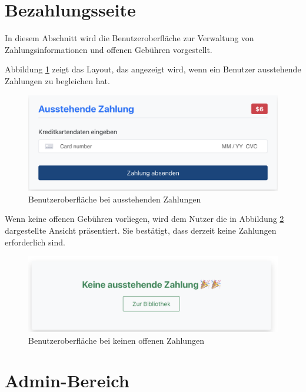 \section{Bezahlungsseite}

In diesem Abschnitt wird die Benutzeroberfläche zur Verwaltung von Zahlungsinformationen und offenen Gebühren vorgestellt.

\noindent Abbildung \ref{fig:Outstanding-payment} zeigt das Layout, das angezeigt wird, wenn ein Benutzer ausstehende Zahlungen zu begleichen hat. 

\begin{figure}[H]
	\centering
	\includegraphics[width=1.0\textwidth]{images/UI-screenshots/Outstanding-payment.png}
	\caption{Benutzeroberfläche bei ausstehenden Zahlungen}
	\label{fig:Outstanding-payment}
\end{figure}

\noindent Wenn keine offenen Gebühren vorliegen, wird dem Nutzer die in Abbildung \ref{fig:No-Payment} dargestellte Ansicht präsentiert. Sie bestätigt, dass derzeit keine Zahlungen erforderlich sind.

\begin{figure}[H]
	\centering
	\includegraphics[width=1.0\textwidth]{images/UI-screenshots/No-Payment.png}
	\caption{Benutzeroberfläche bei keinen offenen Zahlungen}
	\label{fig:No-Payment}
\end{figure}

\section{Admin-Bereich}

